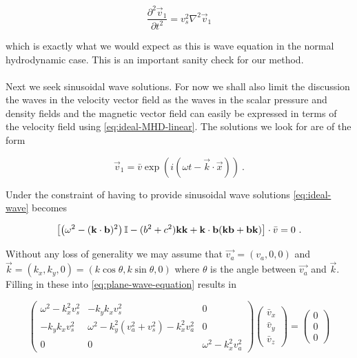$$ \frac{\partial^2 \vec{v}_1}{\partial t^2} = v_s^2 \nabla^2 \vec{v}_1 $$

which is exactly what we would expect as this is wave equation in the normal hydrodynamic case. This is an important sanity check for our method.\\
\\

Next we seek sinusoidal wave solutions. 
For now we shall also limit the discussion the waves in the velocity vector field as the waves in the scalar pressure and density fields and the magnetic vector field can easily be expressed in terms of the velocity field using \cref{eq:ideal-MHD-linear}. 
The solutions we look for are of the form

$$ \vec{v}_1 = \bar{v} \exp(i(\omega t - \vec{k} \cdot \vec{x})) \ .$$ 

Under the constraint of having to provide sinusoidal wave solutions \cref{eq:ideal-wave} becomes

\begin{equation}
\label{eq:plane-wave-equation}
\left[ \left( \omega^2 - (\mathbf{k}\cdot \mathbf{b})^2 \right) \mathbb{I} - (b^2 + c^2)\mathbf{k}\mathbf{k} + \mathbf{k} \cdot \mathbf{b}(\mathbf{k}\mathbf{b} + \mathbf{b}\mathbf{k}) \right] \cdot \bar{v} = 0 \ .
\end{equation} 

Without any loss of generality we may assume that $\vec{v_a} = (v_a,0,0)$ and $\vec{k} = (k_x, k_y, 0) = (k\cos\theta, k\sin\theta, 0)$ where $\theta$ is the angle between $\vec{v_a}$ and $\vec{k}$. Filling in these into \cref{eq:plane-wave-equation} results in

\begin{equation}
\label{eq:plane-wave-equation-matrixform}
\begin{pmatrix}
 \omega^ 2-k_x^2 v_s^2  &  - k_y k_x v_s^2  & 0\\
- k_y k_x v_s^2  &  \omega^2  - k_y^2 (v_a^2 + v_s^2) - k_x^2 v_a^2  &  0\\
0  &  0  & \omega^2  -  k_x^2 v_a^2
\end{pmatrix}
\begin{pmatrix}
\bar{v}_x \\
\bar{v}_y \\
\bar{v}_z
\end{pmatrix}
 = 
\begin{pmatrix}
0 \\
0 \\
0
\end{pmatrix}
\end{equation} 

